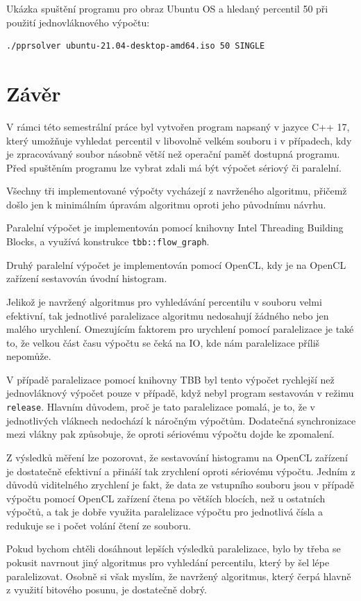 \documentclass[12pt, a4paper]{article}
\let\oldsection\section
\renewcommand\section{\clearpage\oldsection}
\begin{document}
Ukázka spuštění programu pro obraz Ubuntu OS a hledaný percentil 50 při použití jednovláknového výpočtu:
\begin{lstlisting}
./pprsolver ubuntu-21.04-desktop-amd64.iso 50 SINGLE
\end{lstlisting}

\section{Závěr}

V rámci této semestrální práce byl vytvořen program napsaný v jazyce C++ 17, který umožňuje vyhledat percentil v libovolně velkém souboru i v případech, kdy je zpracovávaný soubor násobně větší než operační paměť dostupná programu.
Před spuštěním programu lze vybrat zdali má být výpočet sériový či paralelní.

Všechny tři implementované výpočty vycházejí z navrženého algoritmu, přičemž došlo jen k minimálním úpravám algoritmu oproti jeho původnímu návrhu.

Paralelní výpočet je implementován pomocí knihovny Intel Threading Building Blocks, a využívá konstrukce \texttt{tbb::flow\_graph}.

Druhý paralelní výpočet je implementován pomocí OpenCL, kdy je na OpenCL zařízení sestavován úvodní histogram.

Jelikož je navržený algoritmus pro vyhledávání percentilu v souboru velmi efektivní, tak jednotlivé paralelizace algoritmu nedosahují žádného nebo jen malého urychlení. 
Omezujícím faktorem pro urychlení pomocí paralelizace je také to, že velkou část času výpočtu se čeká na IO, kde nám paralelizace příliš nepomůže.

V případě paralelizace pomocí knihovny TBB byl tento výpočet rychlejší než jednovláknový výpočet pouze v případě, když nebyl program sestavován v režimu \texttt{release}.
Hlavním důvodem, proč je tato paralelizace pomalá, je to, že v jednotlivých vláknech nedochází k náročným výpočtům.
Dodatečná synchronizace mezi vlákny pak způsobuje, že oproti sériovému výpočtu dojde ke zpomalení.

Z výsledků měření lze pozorovat, že sestavování histogramu na OpenCL zařízení je dostatečně efektivní a přináší tak zrychlení oproti sériovému výpočtu.
Jedním z důvodů viditelného zrychlení je fakt, že data ze vstupního souboru jsou v případě výpočtu pomocí OpenCL zařízení čtena po větších blocích, než u ostatních výpočtů, a tak je dobře využita paralelizace výpočtu pro jednotlivá čísla a redukuje se i počet volání čtení ze souboru.

Pokud bychom chtěli dosáhnout lepších výsledků paralelizace, bylo by třeba se pokusit navrnout jiný algoritmus pro vyhledání percentilu, který by šel lépe paralelizovat.
Osobně si však myslím, že navržený algoritmus, který čerpá hlavně z využití bitového posunu, je dostatečně dobrý.
\end{document}
